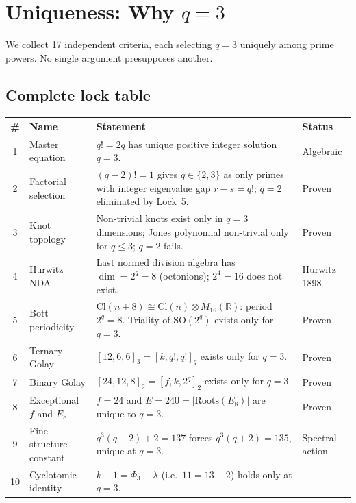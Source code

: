 \documentclass[12pt,a4paper]{article}
\theoremstyle{definition}
\newcommand{\SO}{\mathrm{SO}}
\newcommand{\Cl}{\mathrm{Cl}}
\newcommand{\Phithree}{\Phi_3}
\newcommand{\RR}{\mathbb{R}}
\begin{document}
\section{Uniqueness: Why \texorpdfstring{$q=3$}{q=3}}
\label{sec:uniqueness}

We collect 17 independent criteria, each selecting $q=3$ uniquely
among prime powers.  No single argument presupposes another.

\subsection{Complete lock table}

\begin{center}
\renewcommand{\arraystretch}{1.3}
\begin{tabular}{clp{6.2cm}l}
\hline
\textbf{\#} & \textbf{Name} & \textbf{Statement} & \textbf{Status} \\
\hline
1  & Master equation &
  $q!=2q$ has unique positive integer solution $q=3$. &
  Algebraic \\[2pt]
2  & Factorial selection &
  $(q-2)!=1$ gives $q\in\{2,3\}$ as only primes with integer eigenvalue
  gap $r-s=q!$; $q=2$ eliminated by Lock~5. &
  Proven \\[2pt]
3  & Knot topology &
  Non-trivial knots exist only in $q=3$ dimensions;
  Jones polynomial non-trivial only for $q\le 3$; $q=2$ fails. &
  Proven \\[2pt]
4  & Hurwitz NDA &
  Last normed division algebra has $\dim=2^q=8$ (octonions);
  $2^4=16$ does not exist. &
  Hurwitz 1898 \\[2pt]
5  & Bott periodicity &
  $\Cl(n+8)\cong\Cl(n)\otimes M_{16}(\RR)$: period $2^q=8$.
  Triality of $\SO(2^q)$ exists only for $q=3$. &
  Proven \\[2pt]
6  & Ternary Golay &
  $[12,6,6]_3 = [k,q!,q!]_q$ exists only for $q=3$. &
  Proven \\[2pt]
7  & Binary Golay &
  $[24,12,8]_2=[f,k,2^q]_2$ exists only for $q=3$. &
  Proven \\[2pt]
8  & Exceptional $f$ and $E_8$ &
  $f=24$ and $E=240=|\mathrm{Roots}(E_8)|$ are unique to $q=3$. &
  Proven \\[2pt]
9  & Fine-structure constant &
  $q^3(q+2)+2=137$ forces $q^3(q+2)=135$, unique at $q=3$. &
  Spectral action \\[2pt]
10 & Cyclotomic identity &
  $k-1=\Phithree-\lambda$ (i.e.\ $11=13-2$) holds only at $q=3$. &

\end{tabular}
\end{center}
\end{document}
